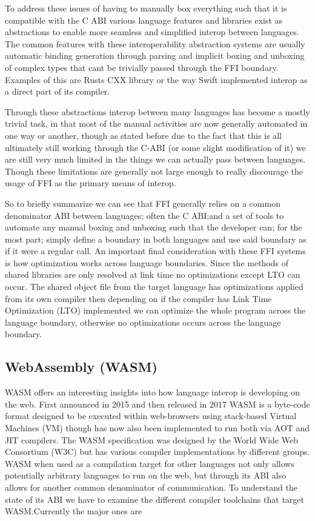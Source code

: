 To address these issues of having to manually box everything such that it is compatible with the C ABI various language features and libraries exist as abstractions to enable more seamless and simplified interop between languages. The common features with these interoperability abstraction systems are usually automatic binding generation through parsing and implicit boxing and unboxing of complex types that cant be trivially passed through the FFI boundary. Examples of this are Rusts CXX library or the way Swift implemented interop as a direct part of its compiler.

Through these abstractions interop between many languages has become a mostly trivial task, in that most of the manual activities are now generally automated in one way or another, though as stated before due to the fact that this is all ultimately still working through the C-ABI (or some slight modification of it) we are still very much limited in the things we can actually pass between languages. Though these limitations are generally not large enough to really discourage the usage of FFI as the primary means of interop. 

So to briefly summarize we can see that FFI generally relies on a common denominator ABI between languages; often the C ABI;\@ and a set of tools to automate any manual boxing and unboxing such that the developer can; for the most part; simply define a boundary in both languages and use said boundary as if it were a regular call. An important final consideration with these FFI systems is how optimization works across language boundaries. Since the methods of shared libraries are only resolved at link time no optimizations except LTO can occur. The shared object file from the target language has optimizations applied from its own compiler then depending on if the compiler has Link Time Optimization (LTO) implemented we can optimize the whole program across the language boundary, otherwise no optimizations occurs across the language boundary.

\subsection{WebAssembly (WASM)}

WASM offers an interesting insights into how language interop is developing on the web. First announced in 2015 and then released in 2017 WASM is a byte-code format designed to be executed within web-browsers using stack-based Virtual Machines (VM) though has now also been implemented to run both via AOT and JIT compilers. The WASM specification was designed by the World Wide Web Consortium (W3C) but has various compiler implementations by different groups.  WASM when used as a compilation target for other languages not only allows potentially arbitrary languages to run on the web, but through its ABI also allows for another common denominator of communication. To understand the state of its ABI we have to examine the different compiler toolchains that target WASM.\@ Currently the major ones are 

